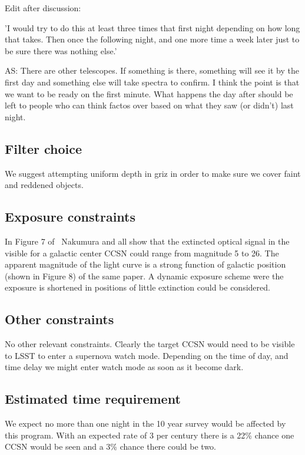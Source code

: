\documentclass[12pt, letterpaper]{article}
\begin{document}
Edit after discussion:

'I would try to do this at least three times that first night depending
on how long that takes.  Then once the following night, and one more
time a week later just to be sure there was nothing else.' 

AS: There are other telescopes. If something is there, something will see it by the first day and something else will take spectra to confirm. I think the point is that we want to be ready on the first minute. What happens the day after should be left to people who can think factos over based on what they saw (or didn't) last night.


\subsection{Filter choice}

We suggest attempting uniform depth in griz in order to make sure we
cover faint and reddened objects.

\subsection{Exposure constraints}

In Figure 7 of~\cite{2016MNRAS.461.3296N} Nakumura and all show that
the extincted optical signal in the visible for a galactic center CCSN
could range from magnitude 5 to 26. The apparent magnitude of the
light curve is a strong function of galactic position (shown in Figure
8) of the same paper.  A dynamic exposure scheme were the exposure is
shortened in positions of little extinction could be considered.

\subsection{Other constraints}

No other relevant constraints.  Clearly the target CCSN would need to be
visible to LSST to enter a supernova watch mode.  Depending on the
time of day, and time delay we might enter watch mode as soon as it
become dark.

\subsection{Estimated time requirement}

We expect no more than one night in the 10 year survey would be
affected by this program. With an expected rate of 3 per century there
is a 22\% chance one CCSN would be seen and a 3\% chance there could
be two.
\end{document}
